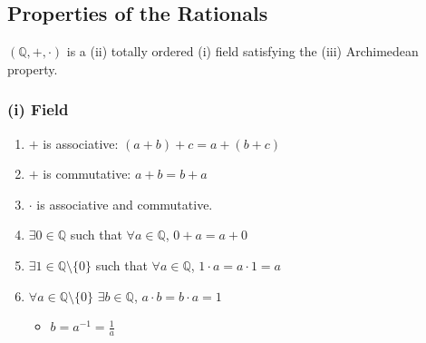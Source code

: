 \documentclass[11pt]{article}
\newcommand{\0}{\emptyset}
\newcommand{\Q}{\mathbb{Q}}
\begin{document}
\subsection*{Properties of the Rationals}
\label{sec:org65f27dd}
\((\Q,+,\cdot)\) is a (ii) totally ordered (i) field satisfying the (iii) Archimedean property.\\[0pt]
\subsubsection*{(i) Field}
\label{sec:org6471e30}
\begin{enumerate}
\item \(+\) is associative: \((a+b)+c=a+(b+c)\)\\[0pt]
\item \(+\) is commutative: \(a+b=b+a\)\\[0pt]
\item \(\cdot\) is associative and commutative.\\[0pt]
\item \(\exists 0\in\Q\) such that \(\forall a\in\Q\), \(0+a=a+0\)\\[0pt]
\item \(\exists 1\in\Q\setminus\{0\}\) such that \(\forall a\in\Q\), \(1\cdot a=a\cdot 1=a\)\\[0pt]
\item \(\forall a\in\Q\setminus\{0\}\) \(\exists b\in\Q\), \(a\cdot b=b\cdot a=1\)\\[0pt]
\begin{itemize}
\item \(b=a^{-1}=\frac{1}{a}\)\\[0pt]
\end{itemize}
\end{enumerate}
\end{document}
